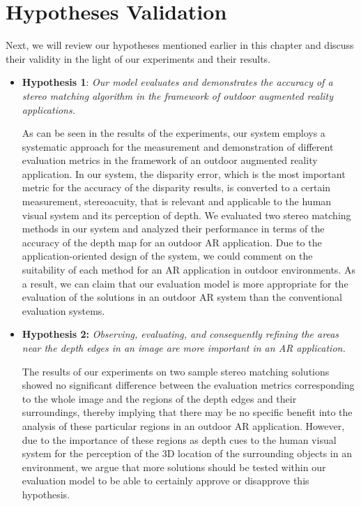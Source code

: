 \section{Hypotheses Validation}
Next, we will review our hypotheses mentioned earlier in this chapter and discuss their validity in the light of our experiments and their results.

\begin{itemize}
\item \textbf{Hypothesis 1}: \emph{Our model evaluates and demonstrates the accuracy of a stereo matching algorithm in the framework of 
outdoor augmented reality applications.} 

As can be seen in the results of the experiments, our system employs a systematic approach for the measurement and demonstration of different 
evaluation metrics in the framework of an outdoor augmented reality application. 
In our system, the disparity error, which is the most important metric for the accuracy of the disparity results, 
is converted to a certain measurement, stereoacuity, that is relevant and applicable to the human visual
system and its perception of depth. We evaluated two stereo matching methods in our system and analyzed their performance in terms of
the accuracy of the depth map for an outdoor AR application. Due to the application-oriented design of the system, we could comment on the suitability of each method
for an AR application in outdoor environments. As a result, we can claim that our evaluation model is more appropriate for the evaluation of the solutions 
in an outdoor AR system than the conventional evaluation systems.

\item \textbf{Hypothesis 2:} \emph{Observing, evaluating, and consequently 
refining the areas near the depth edges in an image are more important in an AR application.}

The results of our experiments on two sample stereo matching solutions showed no significant difference between the evaluation metrics corresponding to the whole image and
the regions of the depth edges and their surroundings, thereby implying that there may be no specific benefit into the analysis of these particular regions 
in an outdoor AR application.
However, due to the importance of these regions as depth cues to the human visual system for the perception of the 3D location of the surrounding 
objects in an environment, we argue that more solutions should be tested within our evaluation model 
to be able to certainly approve or disapprove this hypothesis. 


\end{itemize}
